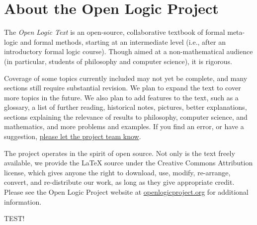 \chapter*{About the Open Logic Project}

The \textit{Open Logic Text} is an open-source, collaborative textbook
of formal meta-logic and formal methods, starting at an intermediate level
(i.e., after an introductory formal logic course). Though aimed at a
non-mathematical audience (in particular, students of philosophy and
computer science), it is rigorous.

Coverage of some topics currently included may
not yet be complete, and many sections still require substantial
revision. We plan to expand the text to cover more topics in
the future. We also plan to add features to the text, such as a
glossary, a list of further reading, historical notes, pictures, better
explanations, sections explaining the relevance of results to
philosophy, computer science, and mathematics, and more problems and
examples. If you find an error, or have a suggestion,
\href{https://github.com/OpenLogicProject/OpenLogic/wiki/Contributing}{please let the project team know}.

The project operates in the spirit of open source. Not only is the
text freely available, we provide the LaTeX source under the
Creative Commons Attribution license, which gives anyone the right to
download, use, modify, re-arrange, convert, and re-distribute our
work, as long as they give appropriate credit.
Please see the Open Logic Project website at
\href{http://openlogicproject.org/}{openlogicproject.org} for
additional information.

TEST!
